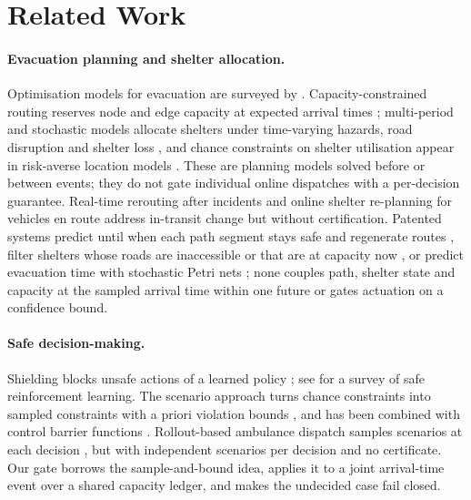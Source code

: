 \documentclass[letterpaper]{article}
\begin{document}
\section{Related Work}

\paragraph{Evacuation planning and shelter allocation.} Optimisation models for evacuation are
surveyed by \citet{hamacher2002evacuation}. Capacity-constrained routing reserves node and edge capacity
at expected arrival times \citep{lu2005ccrp}; multi-period and stochastic models allocate shelters under
time-varying hazards, road disruption and shelter loss
\citep{gama2016shelter,bayram2018shelter}, and chance constraints on shelter utilisation appear in
risk-averse location models \citep{ijerph2019riskaverse}. These are planning models solved before or
between events; they do not gate individual online dispatches with a per-decision guarantee.
Real-time rerouting after incidents \citep{lim2016reroute} and online shelter re-planning for vehicles en
route \citep{idoudi2023vanet} address in-transit change but without certification. Patented systems
predict until when each path segment stays safe and regenerate routes \citep{us12281909}, filter shelters
whose roads are inaccessible or that are at capacity now \citep{us11454506}, or predict evacuation time
with stochastic Petri nets \citep{ep3220325}; none couples path, shelter state and capacity at the
sampled arrival time within one future or gates actuation on a confidence bound.

\paragraph{Safe decision-making.} Shielding blocks unsafe actions of a learned policy
\citep{alshiekh2018shield}; see \citet{garcia2015safe} for a survey of safe reinforcement learning.
The scenario approach turns chance constraints into sampled constraints with a priori violation bounds
\citep{calafiore2006scenario}, and has been combined with control barrier functions
\citep{nascimento2024scenariocbf}. Rollout-based ambulance dispatch samples scenarios at each decision
\citep{rollout2024ambulance}, but with independent scenarios per decision and no certificate. Our gate
borrows the sample-and-bound idea, applies it to a joint arrival-time event over a shared capacity
ledger, and makes the undecided case fail closed.
\end{document}

